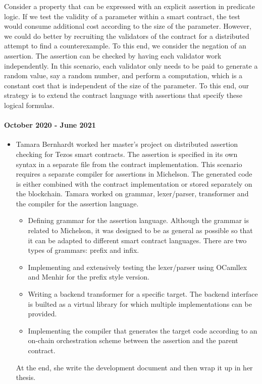\documentclass[a4paper,11pt]{article}
\begin{document}
Consider a property that can be expressed with an explicit assertion in predicate logic. If we test the validity of a parameter within a smart contract, the test would consume additional cost according to the size of the parameter. However, we could do better by recruiting the validators of the contract for a distributed attempt to find a counterexample. To this end, we consider the negation of an assertion. The assertion can be checked by having each validator work independently. In this scenario, each validator only needs to be paid to generate a random value, say a random number, and perform a computation, which is a constant cost that is independent of the size of the parameter. To this end, our strategy is to extend the contract language with assertions that specify these logical formulas.

\paragraph{October 2020 - June 2021}
\begin{itemize}
\item Tamara Bernhardt worked her master's project on distributed assertion checking for Tezos smart contracts. The assertion is specified in its own syntax in a separate file from the contract implementation. This scenario requires a separate compiler for assertions in Michelson. The generated code is either combined with the contract implementation or stored separately on the blockchain. Tamara worked on grammar, lexer/parser, transformer and the compiler for the assertion language. 
\begin{itemize}
\item Defining grammar for the assertion language. Although the grammar is related to Michelson, it was designed to be as general as possible so that it can be adapted to different smart contract languages. There are two types of grammars: prefix and infix.
\item Implementing and extensively testing the lexer/parser using OCamllex and Menhir for the prefix style version.
\item Writing a backend transformer for a specific target. The backend interface is builted as a virtual library for which multiple implementations can be provided.
\item Implementing the compiler that generates the target code according to an on-chain orchestration scheme between the assertion and the parent contract.
\end{itemize}
At the end, she write the development document and then wrap it up in her thesis.
\end{itemize}
\end{document}

